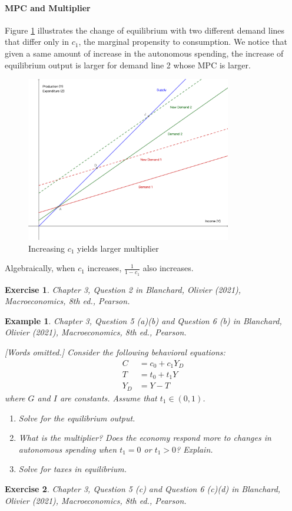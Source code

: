 \documentclass[12pt]{article}
\newtheorem{example}{Example}
\newtheorem{exercise}{Exercise}
\numberwithin{equation}{section}
\begin{document}
\paragraph{MPC and Multiplier}
Figure \ref{fig:key_cross_v3} illustrates the change of equilibrium with two different demand lines that differ only in $c_1$, the marginal propensity to consumption. We notice that given a same amount of increase in the autonomous spending, the increase of equilibrium output is larger for demand line 2 whose MPC is larger.

\begin{figure}[htp]
    \centering
    \includegraphics[width=0.8\textwidth]{keynesian_cross_c1change.png}
    \caption{Increasing $c_1$ yields larger multiplier}
    \label{fig:key_cross_v3}
\end{figure}

Algebraically, when $c_1$ increases, $\frac{1}{1-c_1}$ also increases.

\begin{exercise}
    Chapter 3, Question 2 in Blanchard, Olivier (2021), \textit{Macroeconomics}, 8th ed., Pearson.
\end{exercise}

\begin{example}
    Chapter 3, Question 5 (a)(b) and Question 6 (b) in Blanchard, Olivier (2021), \textit{Macroeconomics}, 8th ed., Pearson.

    [Words omitted.] Consider the following behavioral equations:
    \begin{align*}
        C &= c_0 + c_1Y_D\\
        T &= t_0 + t_1Y\\
        Y_D &= Y-T
    \end{align*}
    where $G$ and $I$ are constants. Assume that $t_1\in(0,1)$.
    \begin{enumerate}[label=\alph*.]
        \item Solve for the equilibrium output.
        \item What is the multiplier? Does the economy respond more to changes in autonomous spending when $t_1=0$ or $t_1>0$? Explain.
        \item Solve for taxes in equilibrium.
    \end{enumerate}
\end{example}

\vspace{36pt}

\begin{exercise}
    Chapter 3, Question 5 (c) and Question 6 (c)(d) in Blanchard, Olivier (2021), \textit{Macroeconomics}, 8th ed., Pearson.
\end{exercise}
\end{document}
